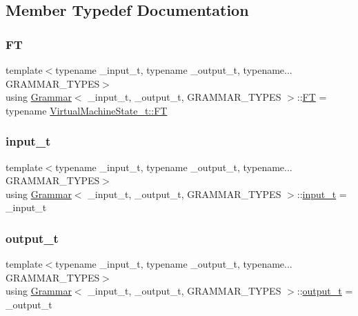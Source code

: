 \subsection{Member Typedef Documentation}
\mbox{\label{class_grammar_af9b9935f4da29e68087b25ef75f22564}} 
\subsubsection{\texorpdfstring{FT}{FT}}
{\footnotesize\ttfamily template$<$typename \+\_\+input\+\_\+t, typename \+\_\+output\+\_\+t, typename... G\+R\+A\+M\+M\+A\+R\+\_\+\+T\+Y\+P\+ES$>$ \\
using \hyperlink{class_grammar}{Grammar}$<$ \+\_\+input\+\_\+t, \+\_\+output\+\_\+t, G\+R\+A\+M\+M\+A\+R\+\_\+\+T\+Y\+P\+ES $>$\+::\hyperlink{class_grammar_af9b9935f4da29e68087b25ef75f22564}{FT} =  typename \hyperlink{class_virtual_machine_state_acacd9869c4a5ff3a765f6bd7d5bae35c}{Virtual\+Machine\+State\+\_\+t\+::\+FT}}

\mbox{\label{class_grammar_a11116f6d2f48f79def498a97549c67d4}} 
\subsubsection{\texorpdfstring{input\+\_\+t}{input\_t}}
{\footnotesize\ttfamily template$<$typename \+\_\+input\+\_\+t, typename \+\_\+output\+\_\+t, typename... G\+R\+A\+M\+M\+A\+R\+\_\+\+T\+Y\+P\+ES$>$ \\
using \hyperlink{class_grammar}{Grammar}$<$ \+\_\+input\+\_\+t, \+\_\+output\+\_\+t, G\+R\+A\+M\+M\+A\+R\+\_\+\+T\+Y\+P\+ES $>$\+::\hyperlink{class_grammar_a11116f6d2f48f79def498a97549c67d4}{input\+\_\+t} =  \+\_\+input\+\_\+t}

\mbox{\label{class_grammar_aee7630d758322022048d06605b07e697}} 
\subsubsection{\texorpdfstring{output\+\_\+t}{output\_t}}
{\footnotesize\ttfamily template$<$typename \+\_\+input\+\_\+t, typename \+\_\+output\+\_\+t, typename... G\+R\+A\+M\+M\+A\+R\+\_\+\+T\+Y\+P\+ES$>$ \\
using \hyperlink{class_grammar}{Grammar}$<$ \+\_\+input\+\_\+t, \+\_\+output\+\_\+t, G\+R\+A\+M\+M\+A\+R\+\_\+\+T\+Y\+P\+ES $>$\+::\hyperlink{class_grammar_aee7630d758322022048d06605b07e697}{output\+\_\+t} =  \+\_\+output\+\_\+t}

